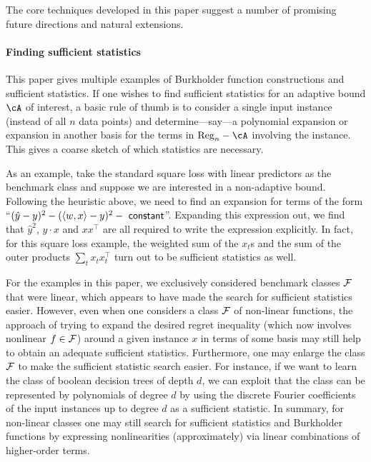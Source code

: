 
The core techniques developed in this paper suggest a number of promising future directions and natural extensions.

\paragraph{Finding sufficient statistics} This paper gives multiple examples of Burkholder function constructions and sufficient statistics. If one wishes to find sufficient statistics for an adaptive bound $\cA$ of interest, a basic rule of thumb is to consider a single input instance (instead of all $n$ data points) and determine---say---a polynomial expansion or expansion in another basis for the terms in $\mathrm{Reg}_{n}-\cA$ involving the instance. This gives a coarse sketch of which statistics are necessary. 

As an example, take the standard square loss with linear predictors as the benchmark class and suppose we are interested in a non-adaptive bound. Following the heuristic above, we need to find an expansion for terms of the form ``$(\hat{y} - y)^2 - (\tri*{w,x} - y)^2 - ~\mathsf{constant}$''. Expanding this expression out, we find that $\hat{y}^2$, $y \cdot x$ and $x x^\top$ are all required to write the expression explicitly. In fact, for this square loss example, the weighted sum of the $x_t$s and the sum of the outer products $\sum_t x_t x_t^\top$ turn out to be sufficient statistics as well.  

For the examples in this paper, we exclusively considered benchmark classes $\F$ that were linear, which appears to have made the search for sufficient statistics easier. However, even when one considers a class $\F$ of non-linear functions, the approach of trying to expand the desired regret inequality (which now involves nonlinear $f \in \F$) around a given instance $x$ in terms of some basis may still help to obtain an adequate sufficient statistics. Furthermore, one may enlarge the class $\F$ to make the sufficient statistic search easier. For instance, if we want to learn the class of boolean decision trees of depth $d$, we can exploit that the class can be represented by polynomials of degree $d$ by using the discrete Fourier coefficients of the input instances up to degree $d$ as a sufficient statistic. In summary, for non-linear classes one may still search for sufficient statistics and Burkholder functions by expressing nonlinearities (approximately) via linear combinations of higher-order terms. 

